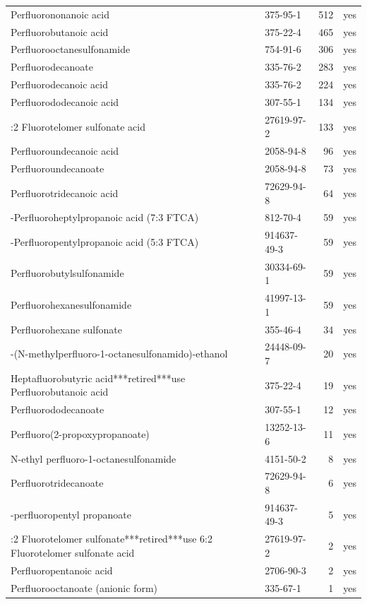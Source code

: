 \begin{longtable}{@{}>{\raggedright\arraybackslash}p{72mm} l r c@{}}
\sloppy Perfluorononanoic acid & 375-95-1 & 512 & yes \\
\sloppy Perfluorobutanoic acid & 375-22-4 & 465 & yes \\
\sloppy Perfluorooctanesulfonamide & 754-91-6 & 306 & yes \\
\sloppy Perfluorodecanoate & 335-76-2 & 283 & yes \\
\sloppy Perfluorodecanoic acid & 335-76-2 & 224 & yes \\
\sloppy Perfluorododecanoic acid & 307-55-1 & 134 & yes \\
\sloppy 6:2 Fluorotelomer sulfonate acid & 27619-97-2 & 133 & yes \\
\sloppy Perfluoroundecanoic acid & 2058-94-8 & 96 & yes \\
\sloppy Perfluoroundecanoate & 2058-94-8 & 73 & yes \\
\sloppy Perfluorotridecanoic acid & 72629-94-8 & 64 & yes \\
\sloppy 3-Perfluoroheptylpropanoic acid (7:3 FTCA) & 812-70-4 & 59 & yes \\
\sloppy 3-Perfluoropentylpropanoic acid (5:3 FTCA) & 914637-49-3 & 59 & yes \\
\sloppy Perfluorobutylsulfonamide & 30334-69-1 & 59 & yes \\
\sloppy Perfluorohexanesulfonamide & 41997-13-1 & 59 & yes \\
\sloppy Perfluorohexane sulfonate & 355-46-4 & 34 & yes \\
\sloppy 2-(N-methylperfluoro-1-octanesulfonamido)-ethanol & 24448-09-7 & 20 & yes \\
\sloppy Heptafluorobutyric acid***retired***use Perfluorobutanoic acid & 375-22-4 & 19 & yes \\
\sloppy Perfluorododecanoate & 307-55-1 & 12 & yes \\
\sloppy Perfluoro(2-propoxypropanoate) & 13252-13-6 & 11 & yes \\
\sloppy N-ethyl perfluoro-1-octanesulfonamide & 4151-50-2 & 8 & yes \\
\sloppy Perfluorotridecanoate & 72629-94-8 & 6 & yes \\
\sloppy 3-perfluoropentyl propanoate & 914637-49-3 & 5 & yes \\
\sloppy 6:2 Fluorotelomer sulfonate***retired***use 6:2 Fluorotelomer sulfonate acid & 27619-97-2 & 2 & yes \\
\sloppy Perfluoropentanoic acid & 2706-90-3 & 2 & yes \\
\sloppy Perfluorooctanoate (anionic form) & 335-67-1 & 1 & yes \\

\end{longtable}
